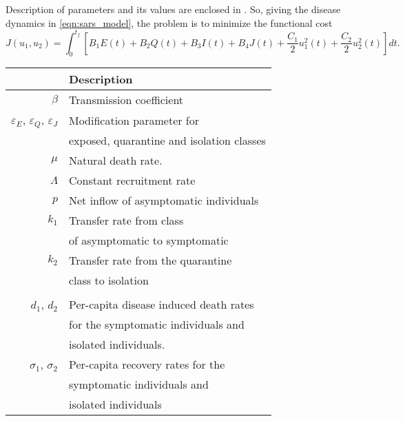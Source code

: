Description of parameters and its values are enclosed 
in .
So, giving the disease dynamics in \eqref{eqn:sars_model}, the problem is to 
minimize the functional cost
\begin{equation}\label{eqn:sars_cost}
  J(u_1,u_2)
    = \int_{0}^{t_f}
      \left[
        B_1 E(t)
        + B_2 Q(t)
        + B_3 I(t)
        + B_4 J(t)
        + \frac{C_1}{2} u_1^2 (t)
        + \frac{C_2}{2} u_2^2 (t)
      \right]
      dt.
\end{equation}
%
\begin{table}[htb]
    \begin{center}
      \begin{tabular}{@{}rl@{}}
        \toprule
        & \multicolumn{1}{l}{\bf{Description}}
        \\
        \midrule
        $\beta$
          & Transmission coefficient
        \\
        $\varepsilon_E$, 
        $\varepsilon_Q$,
        $\varepsilon_J$
          & Modification parameter for 
          \\
          &  exposed, quarantine and isolation classes 
          \\
        $\mu$
          & Natural death rate.
        \\
        $\Lambda$
          & Constant recruitment rate
        \\
        $p$
          & Net inflow of asymptomatic individuals
        \\
        $k_1$ 
          & Transfer rate from class 
          \\
          & of asymptomatic to symptomatic
          \\
        $k_2$
          & Transfer rate from the quarantine 
          \\ 
          & class to isolation
        \\
        \\
        $d_1$, $d_2$
          & Per-capita disease induced death rates 
          \\
          & for the symptomatic individuals and 
          \\
          & isolated individuals.
        \\
        $\sigma_1$, $\sigma_2$
          & Per-capita recovery rates for the 
          \\
          & symptomatic individuals and 
          \\
          &  isolated individuals
        \\

\end{tabular}
\end{center}
\end{table}

